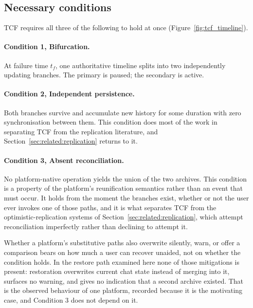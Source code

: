 \subsection{Necessary conditions}
\label{sec:tcf:conditions}

TCF requires all three of the following to hold at once
(Figure~\ref{fig:tcf_timeline}).

\paragraph{Condition 1, Bifurcation.}
At failure time $t_f$, one authoritative timeline splits into two independently
updating branches. The primary is paused; the secondary is active.

\paragraph{Condition 2, Independent persistence.}
Both branches survive and accumulate new history for some duration with zero
synchronisation between them. This condition does most of the work in separating
TCF from the replication literature, and Section~\ref{sec:related:replication}
returns to it.

\paragraph{Condition 3, Absent reconciliation.} No platform-native
operation yields the union of the two archives. This condition is a property of
the platform's reunification semantics rather than an event that must occur. It
holds from the moment the branches exist, whether or not the user ever invokes
one of those paths, and it is what separates TCF from the
optimistic-replication systems of Section~\ref{sec:related:replication}, which
attempt reconciliation imperfectly rather than declining to attempt it.

Whether a platform's substitutive paths also overwrite silently, warn, or offer
a comparison bears on how much a user can recover unaided, not on whether the
condition holds. In the restore path examined here none of those mitigations is
present: restoration overwrites current chat state instead of merging into it,
surfaces no warning, and gives no indication that a second archive existed.
That is the observed behaviour of one platform, recorded because it is the
motivating case, and Condition 3 does not depend on it.

